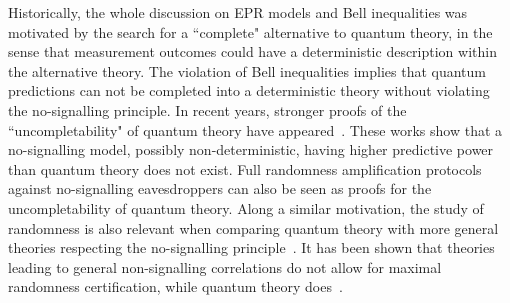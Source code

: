 \documentclass[11pt,a4paper]{article}
\begin{document}
{Historically, the whole discussion on EPR models and Bell
inequalities was motivated by the search for a ``complete" alternative
to quantum theory, in the sense that
measurement outcomes could have a deterministic description within
the alternative theory. The violation of Bell inequalities implies that
quantum predictions can not be completed into a deterministic
theory without violating the no-signalling principle. In recent
years, stronger proofs of the ``uncompletability" of quantum theory
have appeared~\cite{BHK05, bkp, crcompl, crcompl1, crcompl2}. These works show that a no-signalling model, possibly non-deterministic, having higher predictive power than quantum theory does not exist.
%
%
Full randomness amplification protocols against no-signalling eavesdroppers can also be seen as proofs for the uncompletability of quantum theory. Along a similar motivation, the study of randomness is also relevant when comparing quantum theory with more general theories respecting the no-signalling principle~\cite{PR,praboxes}. It has been shown that theories leading to general non-signalling correlations do not allow for maximal randomness certification, while quantum theory does~\cite{maxrand}.

}
\end{document}

